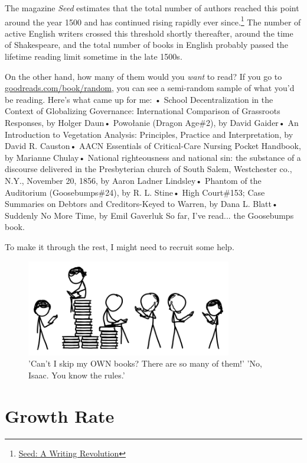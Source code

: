 {{The magazine \emph{Seed} estimates that the total number of authors reached this point around the year 1500 and has continued rising rapidly ever since.{\footnote{ \href{http://seedmagazine.com/content/article/a\_writing\_revolution/}{Seed: A Writing Revolution}} } The number of active English writers crossed this threshold shortly thereafter, around the time of Shakespeare, and the total number of books in English probably passed the lifetime reading limit sometime in the late 1500s.}

{On the other hand, how many of them would you \emph{want} to read? If you go to \href{http://www.goodreads.com/book/random}{goodreads.com/book/random}, you can see a semi-random sample of what you'd be reading. Here's what came up for me:}
• School Decentralization in the Context of Globalizing Governance: International Comparison of Grassroots Responses, by Holger Daun• Powołanie (Dragon Age\#2), by David Gaider• An Introduction to Vegetation Analysis: Principles, Practice and Interpretation, by David R. Causton• AACN Essentials of Critical-Care Nursing Pocket Handbook, by Marianne Chulay• National righteousness and national sin: the substance of a discourse delivered in the Presbyterian church of South Salem, Westchester co., N.Y., November 20, 1856, by Aaron Ladner Lindsley• Phantom of the Auditorium (Goosebumps\#24), by R. L. Stine• High Court\#153; Case Summaries on Debtors and Creditors-Keyed to Warren, by Dana L. Blatt• Suddenly No More Time, by Emil Gaverluk
{So far, I've read... the Goosebumps book.}

{To make it through the rest, I might need to recruit some help.}

\begin{figure}[!htbp]
\centering
\includegraphics[scale=0.5, max width=0.8\textwidth]{imgs/a/76/books_toomany.png}
\caption{'Can't I skip my OWN books? There are so many of them!' 'No, Isaac. You know the rules.'}
\end{figure}

{
\chapter{Growth Rate}
}

}
